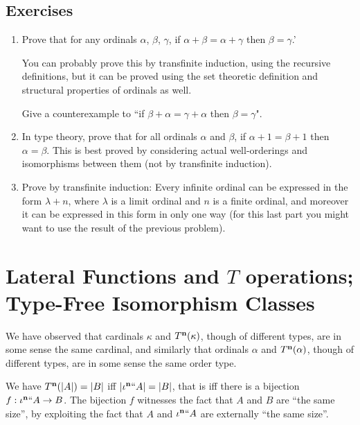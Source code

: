 \documentclass[12pt]{book}
\begin{document}
\newpage

\subsection{Exercises}

\begin{enumerate}

\item

Prove that for any ordinals $\alpha$, $\beta$, $\gamma$, if
$\alpha+\beta=\alpha+\gamma$ then $\beta=\gamma$.'

You can probably prove this by transfinite induction, using the
recursive definitions, but it can be proved using the set theoretic
definition and structural properties of ordinals as well.

Give a counterexample to ``if
$\beta+\alpha=\gamma+\alpha$ then $\beta=\gamma$".

\item In type theory, prove that for all ordinals $\alpha$ and $\beta$, 
if $\alpha+1 = \beta+1$ then $\alpha=\beta$.  This is best proved by
considering actual well-orderings and isomorphisms between them (not
by transfinite induction).

\item
Prove by transfinite induction: Every infinite ordinal can be
expressed in the form $\lambda+n$, where $\lambda$ is a limit ordinal
and $n$ is a finite ordinal, and moreover it can be expressed in this
form in only one way (for this last part you might want to use the
result of the previous problem).

\end{enumerate}

\newpage

\section{Lateral Functions and $T$ operations; Type-Free Isomorphism Classes}

We have observed that cardinals $\kappa$ and $T^{\bf n}(\kappa)$, though of
different types, are in some sense the same cardinal, and similarly
that ordinals $\alpha$ and $T^{\bf n}(\alpha)$, though of different types,
are in some sense the same order type.

We have $T^{\bf n}(|A|) = |B|$ iff $|\iota^{\bf n}``A| = |B|$, that is iff there
is a bijection $f:\iota^{\bf n}``A \rightarrow B$.  The bijection $f$
witnesses the fact that $A$ and $B$ are ``the same size'', by
exploiting the fact that $A$ and $\iota^{\bf n}``A$ are externally ``the
same size''.
\end{document}
